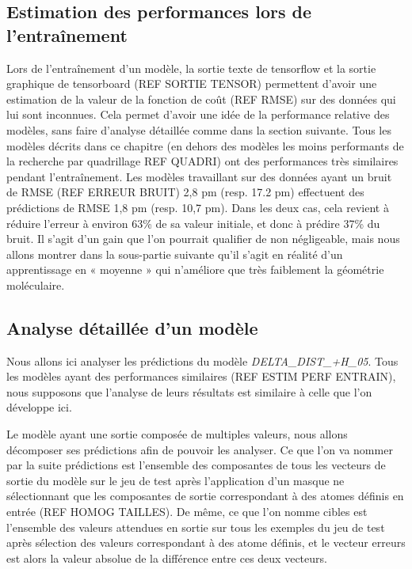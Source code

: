 \subsection{Estimation des performances lors de l'entraînement}

Lors de l'entraînement d'un modèle, la sortie texte de tensorflow et la sortie graphique de tensorboard (REF SORTIE TENSOR) permettent d'avoir une estimation de la valeur de la fonction de coût (REF RMSE) sur des données qui lui sont inconnues. Cela permet d'avoir une idée de la performance relative des modèles, sans faire d'analyse détaillée comme dans la section suivante. Tous les modèles décrits dans ce chapitre (en dehors des modèles les moins performants de la recherche par quadrillage REF QUADRI) ont des performances très similaires pendant l'entraînement. Les modèles travaillant sur des données ayant un bruit de RMSE (REF ERREUR BRUIT) 2,8 pm (resp. 17.2 pm) effectuent des prédictions de RMSE 1,8 pm (resp. 10,7 pm). Dans les deux cas, cela revient à réduire l'erreur à environ 63\% de sa valeur initiale, et donc à prédire 37\% du bruit. Il s'agit d'un gain que l'on pourrait qualifier de non négligeable, mais nous allons montrer dans la sous-partie suivante qu'il s'agit en réalité d'un apprentissage en « moyenne » qui n'améliore que très faiblement la géométrie moléculaire.

\subsection{Analyse détaillée d'un modèle}

\par Nous allons ici analyser les prédictions du modèle \emph{DELTA\_DIST\_+H\_05}. Tous les modèles ayant des performances similaires (REF ESTIM PERF ENTRAIN), nous supposons que l'analyse de leurs résultats est similaire à celle que l'on développe ici.

\par Le modèle ayant une sortie composée de multiples valeurs, nous allons décomposer ses prédictions afin de pouvoir les analyser. Ce que l'on va nommer par la suite prédictions est l'ensemble des composantes de tous les vecteurs de sortie du modèle sur le jeu de test après l'application d'un masque ne sélectionnant que les composantes de sortie correspondant à des atomes définis en entrée (REF HOMOG TAILLES). De même, ce que l'on nomme cibles est l'ensemble des valeurs attendues en sortie sur tous les exemples du jeu de test après sélection des valeurs correspondant à des atome définis, et le vecteur erreurs est alors la valeur absolue de la différence entre ces deux vecteurs.

